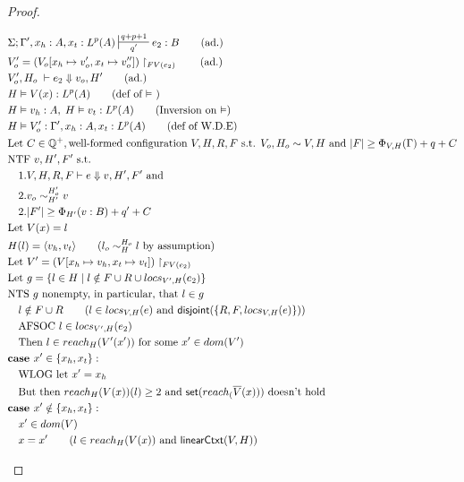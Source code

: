 \documentclass{easychair}
\newcommand{\ms}[1]{\ensuremath{\mathsf{#1}}}
\newcommand{\na}[1]{\mathsf{linearCtxt}(#1)}
\newcommand{\dist}[1]{\mathsf{disjoint}(#1)}
\newcommand{\veq}[4]{#3 \sim^{#1}_{#2} #4}
\theoremstyle{definition}
\begin{document}
\begin{proof}
\begin{description}
\begin{align*}
  &\Sigma; \Gamma', x_h : A, x_t : L^p(A) \sststile{q'}{q + p + 1} e_2 : B \tag{ad.}\\
	&V_o' = (V_o[x_h \mapsto v_o', x_t \mapsto v_o''])\restriction_{FV(e_2)}\tag{ad.}\\
  &V_o',H_o \; \vdash e_2 \Downarrow v_o, H' \tag{ad.}\\
  &H \vDash V(x) : L^p(A) \tag{def of $\vDash$ }\\
  &H\vDash v_h : A,\; H \vDash v_t : L^p(A) \tag{Inversion on $\vDash$}\\
  &H \vDash V_o' : \Gamma', x_h : A, x_t : L^p(A) \tag{def of W.D.E}\\
&\text{Let } C \in \mathbb{Q}^+, \text{well-formed configuration } V,H,R,F \text{ s.t. }
		V_o,H_o \sim V,H
			\text{ and }|F| \ge \Phi_{V,H}(\Gamma) + q + C\\
  &\text{NTF } v,H',F' \text{ s.t. }\\
  &\quad 1. V,H,R,F \vdash e \Downarrow v, H',F' \text{ and }\\ 
	&\quad 2. \veq{H_o'}{H'}{v_o}{v}\\
  &\quad 2. |F'| \ge \Phi_{H'}(v:B) + q' + C\\
	&\text{Let } V(x) =  l\\
		&H(l) = \pairexcst{v_h}{v_t} \tag{$\veq{H_o}{H}{l_o}{l}$ by assumption}\\
	&\text{Let } V' = (V[x_h \mapsto v_h, x_t \mapsto v_t])\restriction_{FV(e_2)}\\
	&\text{Let } g = \{l \in H \mid l \notin F \cup R \cup locs_{V',H}(e_2)\}\\
  &\text{NTS $g$ nonempty, in particular, that } l \in g\\
	&\quad l \notin F \cup R \tag{$l \in locs_{V,H}(e)$ and $\dist{\{R,F,locs_{V,H}(e)\}}$}\\
  &\quad \text{AFSOC } l \in locs_{V',H}(e_2)\\
		&\quad \text{Then } l \in reach_H(V'(x')) \text{ for some } x' \in dom(V')\\
		&\textbf{case }x' \in \{x_h,x_t\}:\\
  &\quad \text{WLOG let } x' = x_h\\
		&\quad \text{But then } reach_H(V(x))(l) \ge 2 \text{ and } \ms{set}(reach_(\overline V(x))) \text{ doesn't hold}\\
		&\textbf{case } x' \notin \{x_h,x_t\}:\\
		&\quad x' \in dom(V)\\
		&\quad x = x' \tag{$l \in reach_H(V(x))$ and $\na{V,H}$}\\

\end{align*}
\end{description}
\end{proof}
\end{document}
